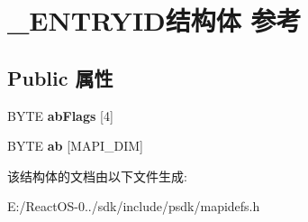 \hypertarget{struct___e_n_t_r_y_i_d}{}\section{\+\_\+\+E\+N\+T\+R\+Y\+I\+D结构体 参考}
\label{struct___e_n_t_r_y_i_d}
\subsection*{Public 属性}
\begin{DoxyCompactItemize}
\item 
\mbox{\label{struct___e_n_t_r_y_i_d_a1bfe86707874960e1c7ce384e82854c3}} 
B\+Y\+TE {\bfseries ab\+Flags} \mbox{[}4\mbox{]}
\item 
\mbox{\label{struct___e_n_t_r_y_i_d_a96be279b18e28adafdf864606c1e08dc}} 
B\+Y\+TE {\bfseries ab} \mbox{[}M\+A\+P\+I\+\_\+\+D\+IM\mbox{]}
\end{DoxyCompactItemize}


该结构体的文档由以下文件生成\+:\begin{DoxyCompactItemize}
\item 
E\+:/\+React\+O\+S-\/0../sdk/include/psdk/mapidefs.\+h\end{DoxyCompactItemize}
